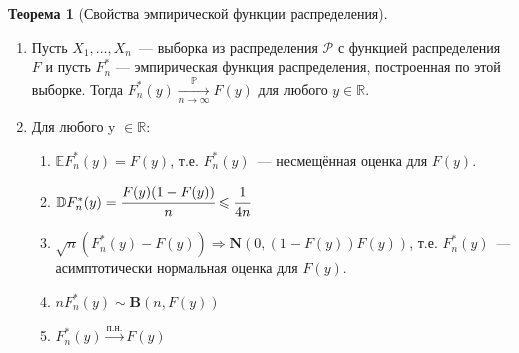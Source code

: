 \documentclass[oneside,final,14pt]{extreport}
\theoremstyle{plain}
\theoremstyle{definition}
\theoremstyle{named}
\newtheorem*{namedthm}{Теорема}
\begin{document}
\begin{namedthm}[Свойства эмпирической функции распределения]\leavevmode
\begin{enumerate}
    \item Пусть $X_{1}, \ldots, X_{n}$~--- выборка из распределения $\mathcal{P}$ с функцией распределения $F$ и пусть $F_{n}^{*}$ — эмпирическая функция распределения, построенная по этой выборке. Тогда $F_{n}^{*}(y) \xrightarrow[n \to \infty]{\mathbb{P}} F(y)$ для любого $y \in \mathbb{R}.$
    \item Для любого y $\in \mathbb{R}$:
    \begin{enumerate}[label={\arabic*)}]
        \item $\mathbb{E} F_{n}^{*}(y)=F(y)$, т.е. $F_{n}^{*}(y)$~--- несмещённая оценка для $F(y)$.
        \item $\mathbb{D} F_{n}^{*}(y)=\cfrac{F(y)(1-F(y))}{n} \leqslant \cfrac{1}{4n}$
        \item $\sqrt{n}(F_{n}^{*}(y)-F(y)) \Rightarrow \mathbf{N}(0, (1-F(y))F(y))$, т.е. $F_{n}^{*}(y)$~--- асимптотически нормальная оценка для $F(y)$.
        \item $n F_{n}^{*}(y) \sim \mathbf{B}(n, F(y))$
        \item $F_{n}^{*}(y) \overset{\text{п.н.}}{\rightarrow} F(y)$ 
    \end{enumerate}
\end{enumerate}
\end{namedthm}
\end{document}
